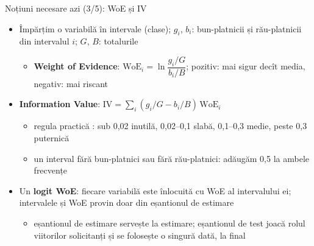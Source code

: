 \begin{frame}{Noțiuni necesare azi (3/5): WoE și IV}
\itemsize{\small}
\begin{itemize}
    \item Împărțim o variabilă în intervale (clase); $g_i$, $b_i$: bun-platnicii și rău-platnicii din intervalul $i$; $G$, $B$: totalurile
    \begin{itemize}
        \item \textbf{Weight of Evidence}: $\mathrm{WoE}_i = \ln\dfrac{g_i/G}{b_i/B}$; pozitiv: mai sigur decît media, negativ: mai riscant
    \end{itemize}
    \item \textbf{Information Value}: $\mathrm{IV} = \sum_i (g_i/G - b_i/B)\,\mathrm{WoE}_i$
    \begin{itemize}
        \item regula practică : sub 0,02 inutilă, 0,02--0,1 slabă, 0,1--0,3 medie, peste 0,3 puternică
        \item un interval fără bun-platnici sau fără rău-platnici: adăugăm 0,5 la ambele frecvențe
    \end{itemize}
    \item Un \textbf{logit WoE}: fiecare variabilă este înlocuită cu WoE al intervalului ei; intervalele și WoE provin doar din eșantionul de estimare
    \begin{itemize}
        \item eșantionul de estimare servește la estimare; eșantionul de test joacă rolul viitorilor solicitanți și se folosește o singură dată, la final
    \end{itemize}
\end{itemize}
\end{frame}

